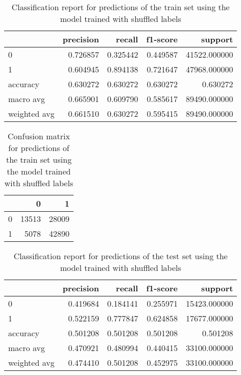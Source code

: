 \documentclass{article}
\begin{document}
\begin{itemize}
\begin{table}[h!]
\centering
\begin{tabular}{lrrrr}
\toprule
{} &  precision &    recall &  f1-score &       support \\
\midrule
0            &   0.726857 &  0.325442 &  0.449587 &  41522.000000 \\
1            &   0.604945 &  0.894138 &  0.721647 &  47968.000000 \\
accuracy     &   0.630272 &  0.630272 &  0.630272 &      0.630272 \\
macro avg    &   0.665901 &  0.609790 &  0.585617 &  89490.000000 \\
weighted avg &   0.661510 &  0.630272 &  0.595415 &  89490.000000 \\
\bottomrule
\end{tabular}
\caption{Classification report for predictions of the train set using the model trained with shuffled labels}
\label{table:model1_tr_sh_cr}
\end{table}

\begin{table}[h!]
\centering
\begin{tabular}{lrr}
\toprule
{} &      0 &      1 \\
\midrule
0 &  13513 &  28009 \\
1 &   5078 &  42890 \\
\bottomrule
\end{tabular}

\caption{Confusion matrix for predictions of the train set using the model trained with shuffled labels}
\label{table:model1_tr_sh_cm}
\end{table}

\begin{table}[h!]
\centering
\begin{tabular}{lrrrr}
\toprule
{} &  precision &    recall &  f1-score &       support \\
\midrule
0            &   0.419684 &  0.184141 &  0.255971 &  15423.000000 \\
1            &   0.522159 &  0.777847 &  0.624858 &  17677.000000 \\
accuracy     &   0.501208 &  0.501208 &  0.501208 &      0.501208 \\
macro avg    &   0.470921 &  0.480994 &  0.440415 &  33100.000000 \\
weighted avg &   0.474410 &  0.501208 &  0.452975 &  33100.000000 \\
\bottomrule
\end{tabular}
\caption{Classification report for predictions of the test set using the model trained with shuffled labels}
\label{table:model1_te_sh_cr}
\end{table}
 

\end{itemize}
\end{document}
